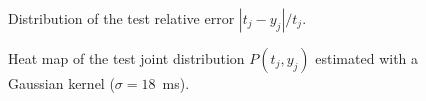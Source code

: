 \documentclass[10pt,a4paper,notitlepage,twocolumn]{article}
\begin{document}
\begin{figure}[!h]
\caption{Distribution of the test relative error $|t_j-y_j|/t_j$.}
\end{figure}


\begin{figure}
\centering
{}
\caption{Heat map of the test joint distribution $P(t_j,y_j)$ estimated with a Gaussian kernel ($\sigma=18$~ms).}
\end{figure}
\end{document}
